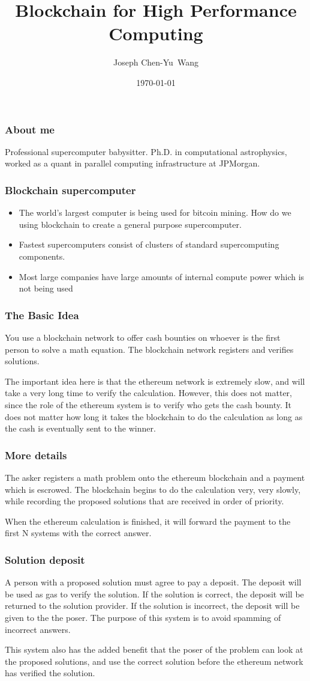 \documentclass{beamer}
\title {Blockchain for High Performance Computing}
\author{Joseph Chen-Yu~Wang}
\institute{Bitquant Research Laboratories (Asia) Limited}
\date{\today}
\begin{document}
\frame{\titlepage}
\begin{frame}
  \frametitle{About me}
Professional supercomputer babysitter.  Ph.D. in computational
astrophysics, worked as a quant in parallel computing 
infrastructure at JPMorgan.
\end{frame}
\begin{frame}
  \frametitle{Blockchain supercomputer}
  \begin{itemize}
  \item The world's largest computer is being used for bitcoin mining.  How do
    we using blockchain to create a general purpose supercomputer.  
  \item Fastest supercomputers consist of clusters of standard
    supercomputing components.
  \item Most large companies have large amounts of internal compute
    power which is not being used
  \end{itemize}
\end{frame}
\begin{frame}
  \frametitle{The Basic Idea}
You use a blockchain network to offer cash bounties on whoever is
the first person to solve a math equation.  The blockchain network
registers and verifies solutions.

The important idea here is that the ethereum network is extremely
slow, and will take a very long time to verify the calculation.  However,
this does not matter, since the role of the ethereum system is to
verify who gets the cash bounty.  It does not matter how long it takes
the blockchain to do the calculation as long as the cash is eventually
sent to the winner.
\end{frame}
\begin{frame}
  \frametitle{More details}
  The asker registers a math problem onto the ethereum blockchain and
  a payment which is escrowed.  The blockchain begins to do the
  calculation very, very slowly, while recording the proposed
  solutions that are received in order of priority.
  
  When the ethereum calculation is finished, it will forward the payment
  to the first N systems with the correct answer.
\end{frame}
\begin{frame}
  \frametitle{Solution deposit}
  A person with a proposed solution must agree to pay a deposit.  The
  deposit will be used as gas to verify the solution.  If the solution
  is correct, the deposit will be returned to the solution provider.
  If the solution is incorrect, the deposit will be given to the the
  poser.  The purpose of this system is to avoid spamming of incorrect
  answers.

  This system also has the added benefit that the poser of the problem
  can look at the proposed solutions, and use the correct solution
  before the ethereum network has verified the solution.
\end{frame}  
\end{document}
